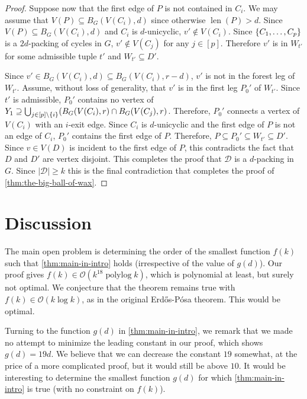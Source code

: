 \documentclass{patmorin}
\newcommand{\pat}[1]{\textcolor{Blue}{[Pat: #1]}}
\DeclareMathOperator{\len}{len}
\DeclareMathOperator{\polylog}{polylog}
\newcommand{\Oh}{\mathcal{O}}
\DeclarePairedDelimiter\set{\{}{\}}
\begin{document}
\begin{proof}
Suppose now that the first edge of $P$ is not contained in $C_i$.  We may assume that $V(P)\subseteq B_G(V(C_i),d)$ since otherwise $\len(P)>d$.  Since $V(P)\subseteq B_G(V(C_i),d)$ and $C_i$ is $d$-unicyclic, $v'\not\in V(C_i)$.  Since $\set{C_1,\ldots,C_p}$
is a $2d$-packing of cycles in $G$, $v'\not\in V(C_j)$ for any $j\in[p]$. Therefore $v'$ is in $W_{t'}$ for some admissible tuple $t'$ and $W_{t'}\subseteq D'$.

Since $v'\in B_G(V(C_i),d)\subseteq B_G(V(C_i),r-d)$, $v'$ is not in the forest leg of $W_{t'}$.
Assume, without loss of generality, that $v'$ is in the first leg $P_0'$ of $W_{t'}$.
Since $t'$ is admissible, $P_0'$ contains no vertex of $Y_1\supseteq \bigcup_{j\in[p]\setminus \set{i}} (B_G(V(C_i),r)\cap B_G(V(C_j),r)$.
Therefore, $P_0'$ connects a vertex of $V(C_i)$ with an $i$-exit edge.
Since $C_i$ is $d$-unicyclic and the first edge of $P$ is not an edge of $C_i$, $P_0'$ contains the first edge of $P$. Therefore, $P\subseteq P_0'\subseteq W_{t'}\subseteq D'$.  Since $v\in V(D)$ is incident to the first edge of $P$, this contradicts the fact that $D$ and $D'$ are vertex disjoint.
This completes the proof that $\mathcal{D}$ is a $d$-packing in $G$. Since $|\mathcal{D}|\geq k$ this is the final contradiction that completes the proof of \cref{thm:the-big-ball-of-wax}.
\end{proof}


\section{Discussion}

The main open problem is determining the order of the smallest function $f(k)$ such that \cref{thm:main-in-intro} holds (irrespective of the value of $g(d)$). 
Our proof gives $f(k)\in\Oh(k^{18}\polylog k)$, which is polynomial at least, but surely not optimal. 
We conjecture that the theorem remains true with $f(k)\in\Oh(k \log k)$, as in the original Erd\H{o}s-P\'osa theorem. 
This would be optimal. 

Turning to the function $g(d)$ in  \cref{thm:main-in-intro}, we remark that we made no attempt to minimize the leading constant in our proof, which shows $g(d)=19d$. 
We believe that we can decrease the constant $19$ somewhat, at the price of a more complicated proof, but it would still be above $10$.   
It would be interesting to determine the smallest function $g(d)$ for which \cref{thm:main-in-intro} is true (with no constraint on $f(k)$). 
\end{document}
